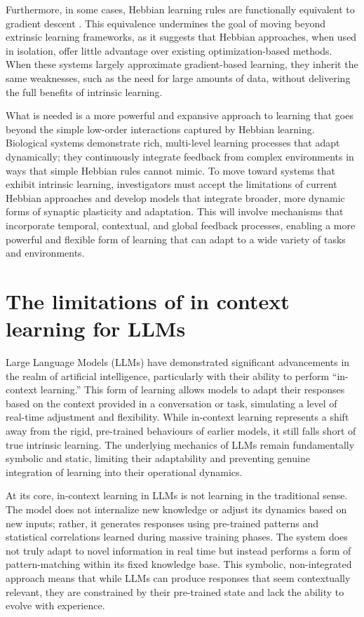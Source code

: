 \documentclass{article}
\begin{document}
Furthermore, in some cases, Hebbian learning rules are functionally
equivalent to gradient descent \cite{xie2003equivalence}. This equivalence
undermines the goal of moving beyond extrinsic learning frameworks,
as it suggests that Hebbian approaches, when used in isolation, offer
little advantage over existing optimization-based methods. When these
systems largely approximate gradient-based learning, they inherit the
same weaknesses, such as the need for large amounts of data, without
delivering the full benefits of intrinsic learning.

What is needed is a more powerful and expansive approach to learning that
goes beyond the simple low-order interactions captured by Hebbian
learning. Biological systems demonstrate rich, multi-level learning
processes that adapt dynamically; they continuously integrate feedback from
complex environments in ways that simple Hebbian rules cannot mimic. To
move toward systems that exhibit intrinsic learning, investigators must
accept the limitations of current Hebbian approaches and develop models that integrate
broader, more dynamic forms of synaptic plasticity and adaptation. This
will involve mechanisms that incorporate temporal, contextual, and
global feedback processes, enabling a more powerful and flexible form
of learning that can adapt to a wide variety of tasks and environments.


\section{The limitations of in context learning for LLMs}

Large Language Models (LLMs) have demonstrated significant advancements
in the realm of artificial intelligence, particularly with their ability
to perform ``in-context learning.'' \cite{dong2024surveyincontextlearning}
This form of learning allows models to adapt their responses based on
the context provided in a conversation or task, simulating a level
of real-time adjustment and flexibility. While in-context learning
represents a shift away from the rigid, pre-trained behaviours of earlier
models, it still falls short of true intrinsic learning. The underlying
mechanics of LLMs remain fundamentally symbolic and static, limiting
their adaptability and preventing genuine integration of learning into
their operational dynamics.

At its core, in-context learning in LLMs is not learning in the
traditional sense. The model does not internalize new knowledge or
adjust its dynamics based on new inputs; rather, it generates responses
using pre-trained patterns and statistical correlations learned
during massive training phases. The system does not truly adapt to novel
information in real time but instead performs a form of pattern-matching
within its fixed knowledge base. This symbolic, non-integrated approach
means that while LLMs can produce responses that seem contextually
relevant, they are constrained by their pre-trained state
and lack the ability to evolve with experience.
\end{document}
